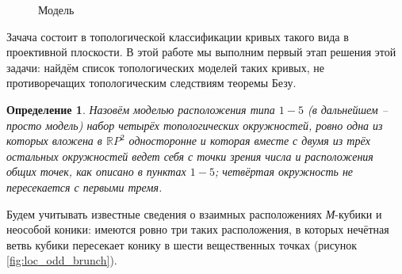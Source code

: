 \documentclass[11pt]{book}
\newtheorem{definition}{Определение}
\numberwithin{exercise}{chapter}
\begin{document}
\begin{figure}[H]
\caption{Модель}
\label{fig:model_1-5}
\end{figure}

Зачача состоит в топологической классификации кривых такого вида в проективной плоскости. В этой работе мы выполним первый этап решения этой задачи: найдём список топологических моделей таких кривых, не противоречащих топологическим следствиям теоремы Безу.

\begin{definition}
Назовём моделью расположения типа $1-5$ (в дальнейшем – просто модель) набор четырёх топологических окружностей, ровно одна из которых вложена в $\mathbb RP^2$ односторонне и которая вместе с двумя из трёх остальных окружностей ведет себя с точки зрения числа и расположения общих точек, как описано в пунктах $1-5$; четвёртая окружность не пересекается с первыми тремя.
\end{definition}

Будем учитывать известные сведения о взаимных расположениях \textit{М}-кубики и неособой коники: имеются ровно три таких расположения, в которых нечётная ветвь кубики пересекает конику в шести вещественных точках (рисунок \ref{fig:loc_odd_brunch}).
\end{document}
